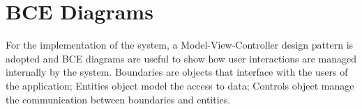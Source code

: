 \section{BCE Diagrams}
For the implementation of the system, a Model-View-Controller design pattern is adopted and BCE diagrams are useful to show how user interactions are managed internally by the system. Boundaries are objects that interface with the users of the application; Entities object model the access to data; Controls object manage the communication between boundaries and entities.
%
%
